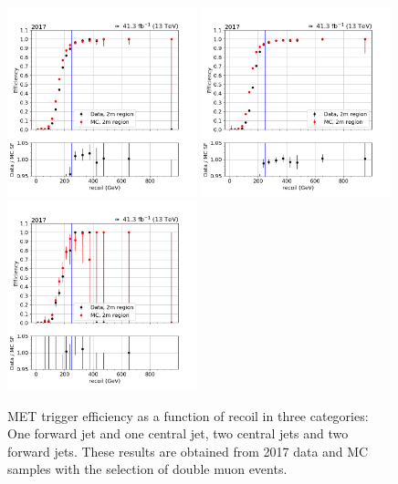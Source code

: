 \begin{figure}[htp]
    \begin{center}
        \includegraphics[width=0.49\textwidth]{fig/efficiency/trigger/met/recoil/data_mc_comparison_2m_2017_one_jet_forward_one_jet_central.png}
        \includegraphics[width=0.49\textwidth]{fig/efficiency/trigger/met/recoil/data_mc_comparison_2m_2017_two_central_jets.png} \\
        \includegraphics[width=0.49\textwidth]{fig/efficiency/trigger/met/recoil/data_mc_comparison_2m_2017_two_forward_jets.png}
    \end{center}
    \caption{MET trigger efficiency as a function of recoil in three categories: One forward jet and one central jet, two central jets and
            two forward jets. These results are obtained from 2017 data and MC samples with the selection of double muon events.}   
    \label{fig:eff_recoil_2017_2m}
\end{figure}

